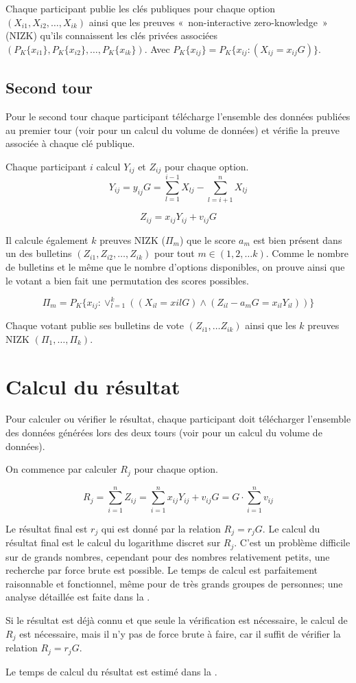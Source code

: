 \documentclass[../report]{subfiles}
\begin{document}
Chaque participant publie les clés publiques pour chaque option $(X_{i1}, X_{i2}, \dots, X_{ik})$ ainsi que les preuves 
«~non-interactive zero-knowledge~» (NIZK) qu'ils connaissent les clés privées associées \\ $(P_K\{x_{i1}\}, P_K\{x_{i2}\}, \dots, P_K\{x_{ik}\})$. 
Avec $P_K\{x_{ij}\} = P_K\{x_{ij}: (X_{ij} = x_{ij} G)\}$.

\subsection{Second tour}

Pour le second tour chaque participant télécharge l'ensemble des données publiées au premier 
tour (voir  pour un calcul du volume de données) et vérifie la
preuve associée à chaque clé publique.

Chaque participant $i$ calcul $Y_{ij}$ et $Z_{ij}$ pour chaque option.
\[
	Y_{ij} = y_{ij} G = \sum_{l=1}^{i-1} X_{lj} - \sum_{l=i+1}^{n} X_{lj}
\]

\[
	Z_{ij} = x_{ij} Y_{ij} + v_{ij} G
\]

Il calcule également $k$ preuves NIZK ($\Pi_m$) que le score $a_{m}$ est bien présent dans un des bulletins 
$(Z_{i1}, Z_{i2}, \dots, Z_{ik})$ pour tout $m \in (1, 2, \dots k)$.
Comme le nombre de bulletins et le même que le nombre d'options disponibles, on prouve ainsi
que le votant a bien fait une permutation des scores possibles.

\[
\Pi_m = P_K\{x_{ij}: \vee_{l=1}^{k} ((X_{il} = x{il} G) \wedge (Z_{il} - a_{m}G = x_{il} Y_{il}) )\}
\]

Chaque votant publie ses bulletins de vote $(Z_{i1}, \dots Z_{ik})$ ainsi que les $k$ preuves NIZK $(\Pi_1, \dots, \Pi_k)$.


\section{Calcul du résultat}\label{sec:res:proto:resultat}

Pour calculer ou vérifier le résultat, chaque participant doit télécharger l'ensemble des données générées lors des 
deux tours (voir  pour un calcul du volume de données).

On commence par calculer $R_j$ pour chaque option.

\[
	R_j = \sum_{i=1}^{n} Z_{ij} = \sum_{i=1}^{n} x_{ij}Y_{ij} + v_{ij}G = G \cdot \sum_{i=1}^{n} v_{ij}
\]

Le résultat final est $r_j$ qui est donné par la relation $R_j = r_j G$.
Le calcul du résultat final est le calcul du logarithme discret sur $R_j$.
C'est un problème difficile sur de grands nombres, cependant pour des nombres 
relativement petits, une recherche par force brute est possible.
Le temps de calcul est parfaitement raisonnable et fonctionnel, même pour de très grands groupes de personnes; 
une analyse détaillée est faite dans la .

Si le résultat est déjà connu et que seule la vérification est nécessaire, le calcul de $R_j$ est nécessaire, mais il n'y
pas de force brute à faire, car il suffit de vérifier la relation $R_j = r_j G$.

Le temps de calcul du résultat est estimé dans la .
\end{document}
